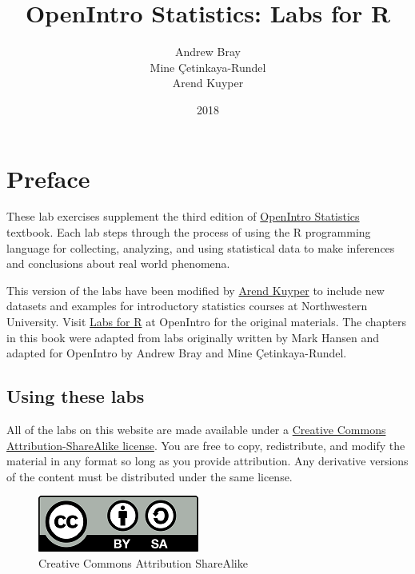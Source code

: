 \documentclass[]{book}
\title{OpenIntro Statistics: Labs for R}
\author{Andrew Bray \\ Mine Çetinkaya-Rundel \\ Arend Kuyper}
\date{2018}
\theoremstyle{definition}
\theoremstyle{definition}
\theoremstyle{definition}
\theoremstyle{remark}
\begin{document}
\maketitle

{
\setcounter{tocdepth}{1}
\tableofcontents
}
\hypertarget{preface}{%
\chapter*{Preface}\label{preface}}

These lab exercises supplement the third edition of
\href{https://www.openintro.org/stat/index.php}{OpenIntro Statistics}
textbook. Each lab steps through the process of using the R programming
language for collecting, analyzing, and using statistical data to make
inferences and conclusions about real world phenomena.

This version of the labs have been modified by
\href{https://www.statistics.northwestern.edu/people/faculty/arend-m-kuyper.html}{Arend
Kuyper} to include new datasets and examples for introductory statistics
courses at Northwestern University. Visit
\href{https://www.openintro.org/stat/labs.php}{Labs for R} at OpenIntro
for the original materials. The chapters in this book were adapted from
labs originally written by Mark Hansen and adapted for OpenIntro by
Andrew Bray and Mine Çetinkaya-Rundel.

\hypertarget{using-these-labs}{%
\section{Using these labs}\label{using-these-labs}}

All of the labs on this website are made available under a
\href{https://creativecommons.org/licenses/by-sa/3.0/}{Creative Commons
Attribution-ShareAlike license}. You are free to copy, redistribute, and
modify the material in any format so long as you provide attribution.
Any derivative versions of the content must be distributed under the
same license.

\begin{figure}
\centering
\includegraphics{./assets/images/by-sa.png}
\caption{Creative Commons Attribution ShareAlike}
\end{figure}
\end{document}
